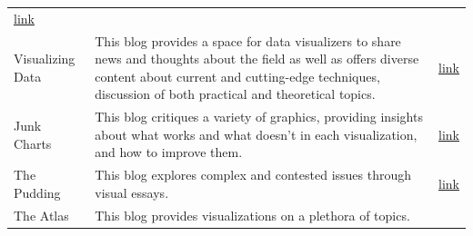\documentclass[]{book}
\begin{document}
\begin{longtable}[]{@{}lll@{}}
\begin{minipage}[t]{0.11\columnwidth}
\href{https://flowingdata.com/}{link}\strut
\end{minipage}\tabularnewline
\begin{minipage}[t]{0.11\columnwidth}\raggedright\strut
Visualizing Data\strut
\end{minipage} & \begin{minipage}[t]{0.20\columnwidth}\raggedright\strut
This blog provides a space for data visualizers to share news and
thoughts about the field as well as offers diverse content about current
and cutting-edge techniques, discussion of both practical and
theoretical topics.\strut
\end{minipage} & \begin{minipage}[t]{0.11\columnwidth}\raggedright\strut
\href{http://www.visualisingdata.com/}{link}\strut
\end{minipage}\tabularnewline
\begin{minipage}[t]{0.11\columnwidth}\raggedright\strut
Junk Charts\strut
\end{minipage} & \begin{minipage}[t]{0.20\columnwidth}\raggedright\strut
This blog critiques a variety of graphics, providing insights about what
works and what doesn't in each visualization, and how to improve
them.\strut
\end{minipage} & \begin{minipage}[t]{0.11\columnwidth}\raggedright\strut
\href{http://junkcharts.typepad.com/}{link}\strut
\end{minipage}\tabularnewline
\begin{minipage}[t]{0.11\columnwidth}\raggedright\strut
The Pudding\strut
\end{minipage} & \begin{minipage}[t]{0.20\columnwidth}\raggedright\strut
This blog explores complex and contested issues through visual
essays.\strut
\end{minipage} & \begin{minipage}[t]{0.11\columnwidth}\raggedright\strut
\href{https://pudding.cool/}{link}\strut
\end{minipage}\tabularnewline
\begin{minipage}[t]{0.11\columnwidth}\raggedright\strut
The Atlas\strut
\end{minipage} & \begin{minipage}[t]{0.20\columnwidth}\raggedright\strut
This blog provides visualizations on a plethora of topics.\strut
\end{minipage} & \begin{minipage}[t]{0.11\columnwidth}\raggedright\strut

\end{minipage}
\end{longtable}
\end{document}
